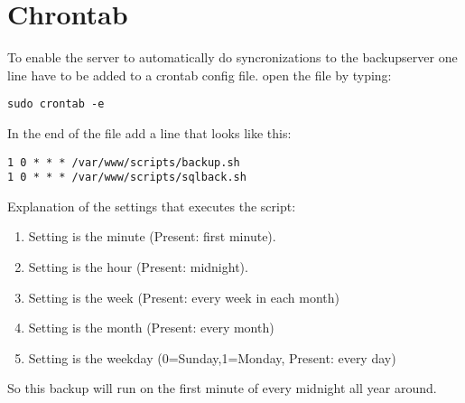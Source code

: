 \section{Chrontab}
To enable the server to automatically do syncronizations to the backupserver one line have to be added to a crontab config file.
open the file by typing:
\begin{verbatim}
sudo crontab -e
\end{verbatim}
In the end of the file add a line that looks like this:
\begin{verbatim}
1 0 * * * /var/www/scripts/backup.sh
1 0 * * * /var/www/scripts/sqlback.sh
\end{verbatim}
Explanation of the settings that executes the script:
\begin{enumerate}
\item Setting is the minute (Present: first minute). 
\item Setting is the hour (Present: midnight).
\item Setting is the week (Present: every week in each month)
\item Setting is the month (Present: every month)
\item Setting is the weekday (0=Sunday,1=Monday, Present: every day)
\end{enumerate}
So this backup will run on the first minute of every midnight all year around.
